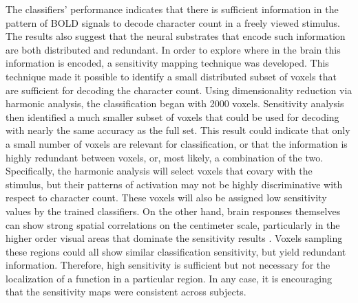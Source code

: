 \documentclass[review,1p,authoryear]{elsarticle}
\begin{document}
The classifiers' performance indicates that there is sufficient information in the pattern of BOLD signals to decode character count in a freely viewed stimulus. 
The results also suggest that the neural substrates that encode such information are both distributed and redundant.
In order to explore where in the brain this information is encoded, a sensitivity mapping technique was developed.
This technique made it possible to identify a small distributed subset of voxels that are sufficient for decoding the character count.
Using dimensionality reduction via harmonic analysis, the classification began with 2000 voxels.
Sensitivity analysis then identified a much smaller subset of voxels that could be used for decoding with nearly the same accuracy as the full set.
This result could indicate that only a small number of voxels are relevant for classification, or that the information is highly redundant between voxels, or, most likely, a combination of the two.
Specifically, the harmonic analysis will select voxels that covary with the stimulus, but their patterns of activation may not be highly discriminative with respect to character count.
These voxels will also be assigned low sensitivity values by the trained classifiers.
On the other hand, brain responses themselves can show strong spatial correlations on the centimeter scale, particularly in the higher order visual areas that dominate the sensitivity results \citep{Engel1997}. 
Voxels sampling these regions could all show similar classification sensitivity, but yield redundant information.
Therefore, high sensitivity is sufficient but not necessary for the localization of a function in a particular region.
In any case, it is encouraging that the sensitivity maps were consistent across subjects.
\end{document}
